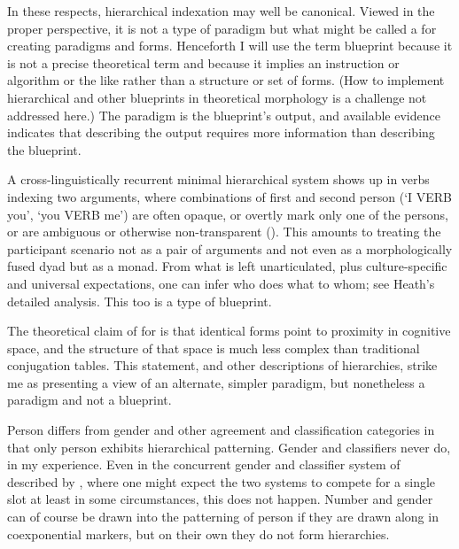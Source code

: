 \documentclass[output=collectionpaper]{langsci/langscibook}
\begin{document}
In these respects, hierarchical indexation may well be canonical. Viewed in the proper perspective, it is not a type of paradigm but what might be called a  for creating paradigms and forms. Henceforth I will use the term blueprint because it is not a precise theoretical term and because it implies an instruction or algorithm or the like rather than a structure or set of forms. (How to implement hierarchical and other blueprints in theoretical morphology is a challenge not addressed here.) The paradigm is the blueprint's output, and available evidence indicates that describing the output requires more information than describing the blueprint.

A cross-linguistically recurrent minimal hierarchical system shows up in verbs indexing two arguments, where combinations of first and second person (`I VERB you', `you VERB me') are often opaque, or overtly mark only one of the persons, or are ambiguous or otherwise non-transparent (\citealt{Heath1991,Heath1998}). This amounts to treating the participant scenario not as a pair of arguments and not even as a morphologically fused dyad but as a monad. From what is left unarticulated, plus culture-specific and universal expectations, one can infer who does what to whom; see Heath's detailed analysis. This too is a type of blueprint.

The theoretical claim of \citet[376]{Kibrik2003} for  is that identical forms point to proximity in cognitive space, and the structure of that space is much less complex than traditional conjugation tables. This statement, and other descriptions of hierarchies, strike me as presenting a view of an alternate, simpler paradigm, but nonetheless a paradigm and not a blueprint.

Person differs from gender and other agreement and classification categories in that only person exhibits hierarchical patterning. Gender and classifiers never do, in my experience. Even in the concurrent gender and classifier system of  described by \citet{Corbett2016}, where one might expect the two systems to compete for a single slot at least in some circumstances, this does not happen. Number and gender can of course be drawn into the patterning of person if they are drawn along in coexponential markers, but on their own they do not form hierarchies.
\end{document}
